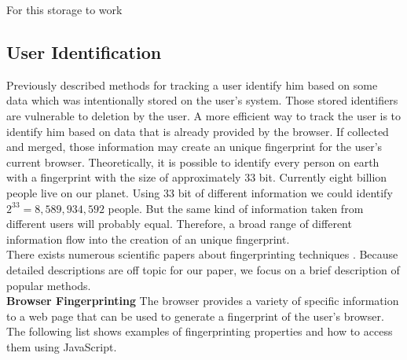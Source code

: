 \documentclass[article,colorback,accentcolor=tud9c,type=bsc]{tudthesis}
\let\stdsubsection\subsection
\renewcommand\subsection{\newpage\stdsubsection}
\begin{document}
	For this storage to work
	
	
\subsection{User Identification} 

	Previously described methods for tracking a user identify him based on some data which was intentionally stored on the user's system. Those stored identifiers are vulnerable to deletion by the user. A more efficient way to track the user is to identify him based on data that is already provided by the browser. If collected and merged, those information may create an unique fingerprint for the user's current browser. Theoretically, it is possible to identify every person on earth with a fingerprint with the size of approximately 33 bit. Currently eight billion people live on our planet. Using 33 bit of different information we could identify $2^{33}=8,589,934,592$ people. But the same kind of information taken from different users will probably equal. Therefore, a broad range of different information flow into the creation of an unique fingerprint. \\
	
	
	There exists numerous scientific papers about fingerprinting techniques \cite{paulstone_historysniffing, MBYS11, Nikiforakis:2013:CME:2497621.2498133, Eckersley:2010:UYW:1881151.1881152, MS12, olejnik:hal-00747841}. Because detailed descriptions are off topic for our paper, we focus on a brief description of popular methods. \\
	
	\textbf{Browser Fingerprinting} The browser provides a variety of specific information to a web page that can be used to generate a fingerprint of the user's browser. The following list shows examples of fingerprinting properties and how to access them using JavaScript. \\
	
\end{document}
